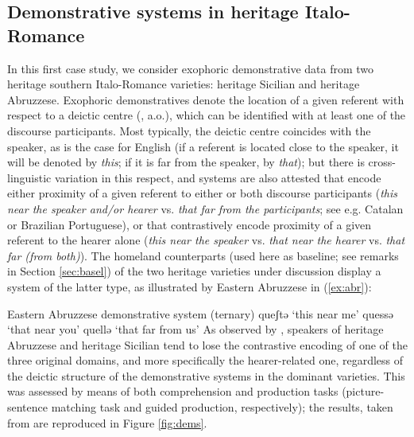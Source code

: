 \documentclass[output=paper]{langscibook}
\begin{document}
\subsection{Demonstrative systems in heritage Italo-Romance\label{sec:dem}}

In this first case study, we consider exophoric demonstrative data from two heritage southern Italo-Romance varieties: heritage Sicilian and heritage Abruzzese. Exophoric demonstratives denote the location of a given referent with respect to a deictic centre (\citealt{Lyons1977, Diessel1999}, a.o.), which can be identified with at least one of the discourse participants. Most typically, the deictic centre coincides with the speaker, as is the case for English (if a referent is located close to the speaker, it will be denoted by \textit{this}; if it is far from the speaker, by \textit{that}); but there is cross-linguistic variation in this respect, and systems are also attested that encode either proximity of a given referent to either or both discourse participants (\textit{this near the speaker and/or hearer} vs. \textit{that far from the participants}; see e.g. Catalan or Brazilian Portuguese), or that contrastively encode proximity of a given referent to the hearer alone (\textit{this near the speaker} vs. \textit{that near the hearer} vs. \textit{that far (from both)}). The homeland counterparts (used here as baseline; see remarks in Section \ref{sec:basel}) of the two heritage varieties under discussion display a system of the latter type, as illustrated by Eastern Abruzzese in (\ref{ex:abr}):

\ea Eastern Abruzzese demonstrative system (ternary)\label{ex:abr}
\ea queʃtə 
    \glt `this near me'
\ex quessə   
    \glt `that near you'
\ex quellə
    \glt `that far from us'
\z
\z
As observed by \citet{Terenghi2022Ls}, speakers of heritage Abruzzese and heritage Sicilian tend to lose the contrastive encoding of one of the three original domains, and more specifically the hearer-related one, regardless of the deictic structure of the demonstrative systems in the dominant varieties. This was assessed by means of both comprehension and production tasks (picture-sentence matching task and guided production, respectively); the results, taken from \citet[9]{Terenghi2022Ls} are reproduced in Figure \ref{fig:dems}.
\end{document}

